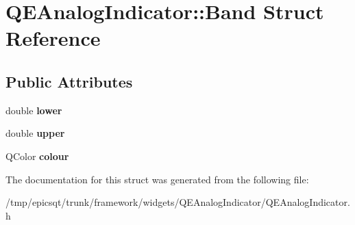 \hypertarget{structQEAnalogIndicator_1_1Band}{
\section{QEAnalogIndicator::Band Struct Reference}
\label{structQEAnalogIndicator_1_1Band}
}
\subsection*{Public Attributes}
\begin{DoxyCompactItemize}
\item 
\hypertarget{structQEAnalogIndicator_1_1Band_a39370b7b679babbc669b2f4f3951be76}{
double {\bfseries lower}}
\label{structQEAnalogIndicator_1_1Band_a39370b7b679babbc669b2f4f3951be76}

\item 
\hypertarget{structQEAnalogIndicator_1_1Band_a8c8a116a4584e92165898fdd82eda13a}{
double {\bfseries upper}}
\label{structQEAnalogIndicator_1_1Band_a8c8a116a4584e92165898fdd82eda13a}

\item 
\hypertarget{structQEAnalogIndicator_1_1Band_a99206cf2f455538663ffb2f3bbee9d18}{
QColor {\bfseries colour}}
\label{structQEAnalogIndicator_1_1Band_a99206cf2f455538663ffb2f3bbee9d18}

\end{DoxyCompactItemize}


The documentation for this struct was generated from the following file:\begin{DoxyCompactItemize}
\item 
/tmp/epicsqt/trunk/framework/widgets/QEAnalogIndicator/QEAnalogIndicator.h\end{DoxyCompactItemize}
